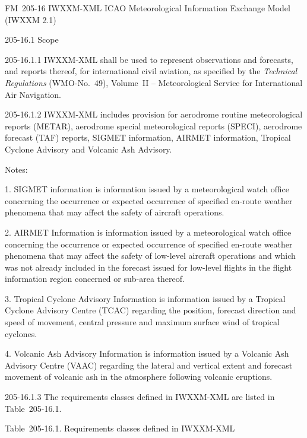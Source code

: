 FM~205-16 IWXXM-XML ICAO Meteorological Information Exchange Model (IWXXM 2.1)

205-16.1 Scope

205-16.1.1 IWXXM-XML shall be used to represent observations and forecasts, and reports thereof, for international civil aviation, as specified by the \emph{Technical Regulations} (WMO-No.~49), Volume~II -- Meteorological Service for International Air Navigation.

205-16.1.2 IWXXM-XML includes provision for aerodrome routine meteorological reports (METAR), aerodrome special meteorological reports (SPECI), aerodrome forecast (TAF) reports, SIGMET information, AIRMET information, Tropical Cyclone Advisory and Volcanic Ash Advisory.

Notes:

1. SIGMET information is information issued by a meteorological watch office concerning the occurrence or expected occurrence of specified en-route weather phenomena that may affect the safety of aircraft operations.

2. AIRMET Information is information issued by a meteorological watch office concerning the occurrence or expected occurrence of specified en-route weather phenomena that may affect the safety of low-level aircraft operations and which was not already included in the forecast issued for low-level flights in the flight information region concerned or sub-area thereof.

3. Tropical Cyclone Advisory Information is information issued by a Tropical Cyclone Advisory Centre (TCAC) regarding the position, forecast direction and speed of movement, central pressure and maximum surface wind of tropical cyclones.

4. Volcanic Ash Advisory Information is information issued by a Volcanic Ash Advisory Centre (VAAC) regarding the lateral and vertical extent and forecast movement of volcanic ash in the atmosphere following volcanic eruptions.

205-16.1.3 The requirements classes defined in IWXXM-XML are listed in Table~205-16.1.

Table~205-16.1. Requirements classes defined in IWXXM-XML

